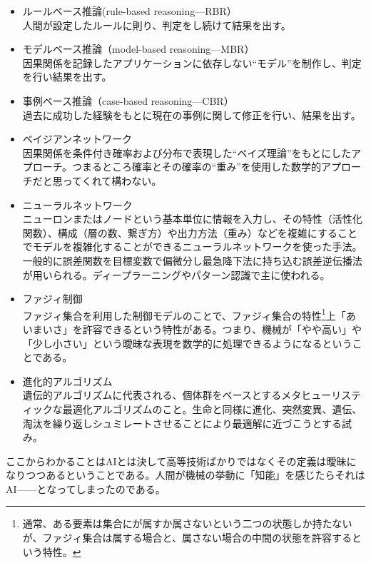 \documentclass[a4paper]{ltjsreport}
\begin{document}
\begin{itemize}
  \item ルールベース推論(rule-based reasoning---RBR）\\
        人間が設定したルールに則り、判定をし続けて結果を出す。
  \item モデルベース推論（model-based  reasoning---MBR）\\
        因果関係を記録したアプリケーションに依存しない``モデル''を制作し、判定を行い結果を出す。
  \item 事例ベース推論（case-based  reasoning---CBR）\\
        過去に成功した経験をもとに現在の事例に関して修正を行い、結果を出す。
  \item ベイジアンネットワーク\\
        因果関係を条件付き確率および分布で表現した``ベイズ理論''をもとにしたアプローチ。つまるところ確率とその確率の``重み''を使用した数学的アプローチだと思ってくれて構わない。
  \item ニューラルネットワーク\\
        ニューロンまたはノードという基本単位に情報を入力し、その特性（活性化関数）、構成（層の数、繋ぎ方）や出力方法（重み）などを複雑にすることでモデルを複雑化することができるニューラルネットワークを使った手法。一般的に誤差関数を目標変数で偏微分し最急降下法に持ち込む誤差逆伝播法が用いられる。ディープラーニングやパターン認識で主に使われる。
  \item ファジィ制御\\
        ファジィ集合を利用した制御モデルのことで、ファジィ集合の特性\footnote{通常、ある要素は集合にが属すか属さないという二つの状態しか持たないが、ファジィ集合は属する場合と、属さない場合の中間の状態を許容するという特性。}上「あいまいさ」を許容できるという特性がある。つまり、機械が「やや高い」や「少し小さい」という曖昧な表現を数学的に処理できるようになるということである。
  \item 進化的アルゴリズム\\
        遺伝的アルゴリズムに代表される、個体群をベースとするメタヒューリスティックな最適化アルゴリズムのこと。生命と同様に進化、突然変異、遺伝、淘汰を繰り返しシュミレートさせることにより最適解に近づこうとする試み。
\end{itemize}

ここからわかることはAIとは決して高等技術ばかりではなくその定義は曖昧になりつつあるということである。人間が機械の挙動に「知能」を感じたらそれはAI------となってしまったのである。
\end{document}
